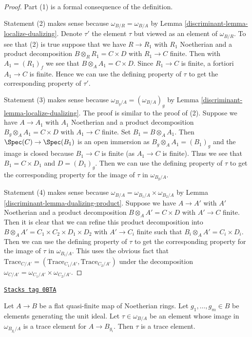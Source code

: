 \begin{proof}

Part (1) is a formal consequence of the definition.

\medskip\noindent
Statement (2) makes sense because $\omega_{B/R} = \omega_{B/A}$
by Lemma \ref{discriminant-lemma-localize-dualizing}. Denote $\tau'$ the element
$\tau$ but viewed as an element of $\omega_{B/R}$. To see that (2) is true
suppose that we have $R \to R_1$ with $R_1$ Noetherian and a product
decomposition $B \otimes_R R_1 = C \times D$ with $R_1 \to C$ finite.
Then with $A_1 = (R_1)_f$ we see that $B \otimes_A A_1 = C \times D$.
Since $R_1 \to C$ is finite, a fortiori $A_1 \to C$ is finite.
Hence we can use the defining property of $\tau$ to get the corresponding
property of $\tau'$.

\medskip\noindent
Statement (3) makes sense because $\omega_{B_g/A} = (\omega_{B/A})_g$
by Lemma \ref{discriminant-lemma-localize-dualizing}. The proof is similar to the proof
of (2). Suppose we have $A \to A_1$ with $A_1$ Noetherian and
a product decomposition $B_g \otimes_A A_1 = C \times D$ with $A_1 \to C$
finite. Set $B_1 = B \otimes_A A_1$. Then
$\Spec(C) \to \Spec(B_1)$ is an open immersion as $B_g \otimes_A A_1 = (B_1)_g$
and the image is closed because $B_1 \to C$ is finite
(as $A_1 \to C$ is finite).
Thus we see that $B_1 = C \times D_1$ and $D = (D_1)_g$. Then we can use
the defining property of $\tau$ to get the corresponding property
for the image of $\tau$ in $\omega_{B_g/A}$.

\medskip\noindent
Statement (4) makes sense because
$\omega_{B/A} = \omega_{B_1/A} \times \omega_{B_2/A}$ by
Lemma \ref{discriminant-lemma-dualizing-product}.
Suppose we have $A \to A'$ with $A'$ Noetherian and
a product decomposition $B \otimes_A A' = C \times D$ with $A' \to C$
finite. Then it is clear that we can refine this product
decomposition into  $B \otimes_A A' = C_1 \times C_2 \times D_1 \times D_2$
with $A' \to C_i$ finite such that $B_i \otimes_A A' = C_i \times D_i$.
Then we can use the defining property of $\tau$ to get the corresponding
property for the image of $\tau$ in $\omega_{B_i/A}$. This uses the obvious
fact that
$\text{Trace}_{C/A'} = (\text{Trace}_{C_1/A'}, \text{Trace}_{C_2/A'})$
under the decomposition
$\omega_{C/A'} = \omega_{C_1/A'} \times \omega_{C_2/A'}$.
\end{proof}

\begin{lemma}
\label{discriminant-lemma-glue-trace}
\href{https://stacks.math.columbia.edu/tag/0BTA}{\texttt{Stacks tag 0BTA}}

Let $A \to B$ be a flat quasi-finite map of Noetherian rings.
Let $g_1, \ldots, g_m \in B$ be elements generating the unit ideal.
Let $\tau \in \omega_{B/A}$ be an element whose image in
$\omega_{B_{g_i}/A}$ is a trace element for $A \to B_{g_i}$.
Then $\tau$ is a trace element.
\end{lemma}


